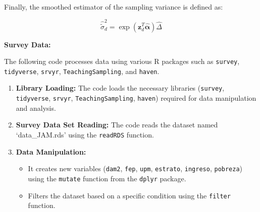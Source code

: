 \documentclass[
  12pt,
]{book}
\providecommand{\tightlist}{%
  \setlength{\itemsep}{0pt}\setlength{\parskip}{0pt}}
\begin{document}
Finally, the smoothed estimator of the sampling variance is defined as:

\[
\hat{\tilde{\sigma}}_{d}^{2}=\exp\left(\boldsymbol{z}_{d}^{T}\hat{\boldsymbol{\alpha}}\right)\hat{\Delta}
\]

\textbf{Survey Data:}

The following code processes data using various R packages such as \texttt{survey}, \texttt{tidyverse}, \texttt{srvyr}, \texttt{TeachingSampling}, and \texttt{haven}.

\begin{enumerate}
\def\labelenumi{\arabic{enumi}.}
\item
  \textbf{Library Loading:} The code loads the necessary libraries (\texttt{survey}, \texttt{tidyverse}, \texttt{srvyr}, \texttt{TeachingSampling}, \texttt{haven}) required for data manipulation and analysis.
\item
  \textbf{Survey Data Set Reading:} The code reads the dataset named `data\_JAM.rds' using the \texttt{readRDS} function.
\item
  \textbf{Data Manipulation:}

  \begin{itemize}
  \tightlist
  \item
    It creates new variables (\texttt{dam2}, \texttt{fep}, \texttt{upm}, \texttt{estrato}, \texttt{ingreso}, \texttt{pobreza}) using the \texttt{mutate} function from the \texttt{dplyr} package.
  \item
    Filters the dataset based on a specific condition using the \texttt{filter} function.
  \end{itemize}
\end{enumerate}
\end{document}
